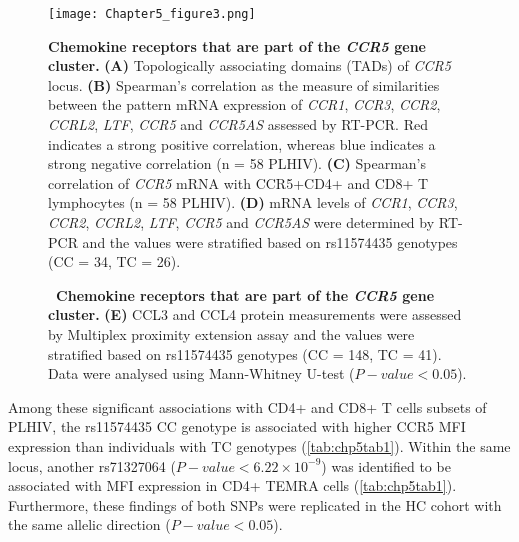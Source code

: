 \documentclass{book}
\begin{document}
\begin{refsection}
\begin{figure}
  \centering
  \texttt{[image: Chapter5\_figure3.png]}
  \caption{
    \label{fig:chp5fig3}
    \textbf{Chemokine receptors that are part of the \textit{CCR5} gene cluster.}
    \textbf{(A)} Topologically associating domains (TADs) of \textit{CCR5} locus.
    \textbf{(B)} Spearman’s correlation as the measure of similarities between the pattern mRNA expression of \textit{CCR1}, \textit{CCR3}, \textit{CCR2}, \textit{CCRL2}, \textit{LTF}, \textit{CCR5} and \textit{CCR5AS} assessed by RT-PCR. Red indicates a strong positive correlation, whereas blue indicates a strong negative correlation (n = 58 PLHIV).
    \textbf{(C)} Spearman’s correlation of \textit{CCR5} mRNA with CCR5+CD4+ and CD8+ T lymphocytes (n = 58 PLHIV).
    \textbf{(D)} mRNA levels of \textit{CCR1}, \textit{CCR3}, \textit{CCR2}, \textit{CCRL2}, \textit{LTF}, \textit{CCR5} and \textit{CCR5AS} were determined by RT-PCR and the values were stratified based on rs11574435 genotypes (CC = 34, TC = 26).
  }
\end{figure}
\begin{figure}
  \addtocounter{figure}{-1}
  \caption{
    \textbf{~Chemokine receptors that are part of the \textit{CCR5} gene cluster.}
    \textbf{(E)} CCL3 and CCL4 protein measurements were assessed by Multiplex proximity extension assay and the values were stratified based on rs11574435 genotypes (CC = 148, TC = 41). Data were analysed using Mann-Whitney U-test ($P-value < 0.05$).
  }
\end{figure}

Among these significant associations with CD4+ and CD8+ T cells subsets of PLHIV, the rs11574435 CC genotype is associated with higher CCR5 MFI expression than individuals with TC genotypes (\ref{tab:chp5tab1}).
Within the same locus, another rs71327064 ($P-value < 6.22 \times 10^{-9}$) was identified to be associated with MFI expression in CD4+ TEMRA cells (\ref{tab:chp5tab1}).
Furthermore, these findings of both SNPs were replicated in the HC cohort with the same allelic direction ($P-value < 0.05$). 


\end{refsection}
\end{document}

